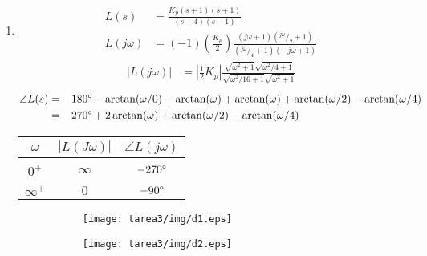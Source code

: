 \begin{ejercicio}
\begin{enumerate}
    \item
      \begin{align*}
        L(s) &= \frac{K_p(s+1)(s+1)}{(s+4)(s-1)} 
        \\
        L(j\omega) &= (-1)\left(\frac{K_p}{2}\right)
          \frac
            {(j\omega+1)(^{j\omega}/_2+1)}
            {(^{j\omega}/_4+1)(-j\omega+1)}
      \end{align*}
      \begin{align*}
        \left|L(j\omega)\right| &= \left|\frac{1}{2}K_p\right| 
          \frac
            {\sqrt{\omega^2 + 1}\sqrt{\omega^2/4 + 1}}
            {\sqrt{\omega^2/16 + 1}\sqrt{\omega^2 + 1}}
      \end{align*}
      \begin{align*}
        \angle L(s) &= -180\degree - \arctan(\omega/0) + \arctan(\omega) + \arctan(\omega) + \arctan(\omega/2) - \arctan(\omega/4)
        \\
        &= - 270\degree + 2 \arctan(\omega) + \arctan(\omega/2) - \arctan(\omega/4)
      \end{align*}

      \begin{center}
        \begin{tabular}{c | c c}
          $\omega$ & $|L(J\omega)|$ & $\angle L(j\omega)$
          \\ \hline \\
          $0^+$ & $\infty$ & $-270\degree$
          \\\\
          $\infty^+$ & $0$ & $-90\degree$
        \end{tabular}
      \end{center}

      \begin{figure}[H]
        \centering
        \begin{subfigure}{0.45\textwidth}
        \centering
          \texttt{[image: tarea3/img/d1.eps]}
        \end{subfigure}
        \begin{subfigure}{0.45\textwidth}
          \centering
          \texttt{[image: tarea3/img/d2.eps]}
        \end{subfigure}
      \end{figure}


\end{enumerate}
\end{ejercicio}
